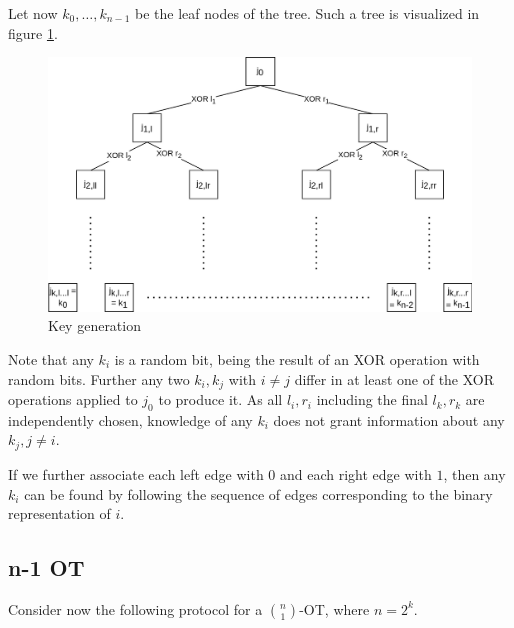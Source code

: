 \documentclass[a4paper]{scrreprt}
\begin{document}
Let now $k_0, \ldots, k_{n-1}$ be the leaf nodes of the tree. Such a tree is
visualized in figure \ref{fig:keygen}.

\begin{figure}[h]
        \centering
		\includegraphics[width=\textwidth]{resources/key_generation}
		\caption{Key generation}
		\label{fig:keygen}
\end{figure}

Note that any $k_i$ is a random bit, being the result of an XOR operation with
random bits. Further any two $k_i, k_j$ with $i \neq j$ differ in at least one
of the XOR operations applied to $j_0$ to produce it. As all $l_i, r_i$
including the final $l_k, r_k$ are independently chosen, knowledge of any $k_i$
does not grant information about any $k_j, j \neq i$.

If we further associate each left edge with $0$ and each right edge with $1$,
then any $k_i$ can be found by following the sequence of edges corresponding to
the binary representation of $i$.

\subsection{n-1 OT}

Consider now the following protocol for a $\binom{n}{1}$-OT, where $n = 2^k$.
\end{document}
